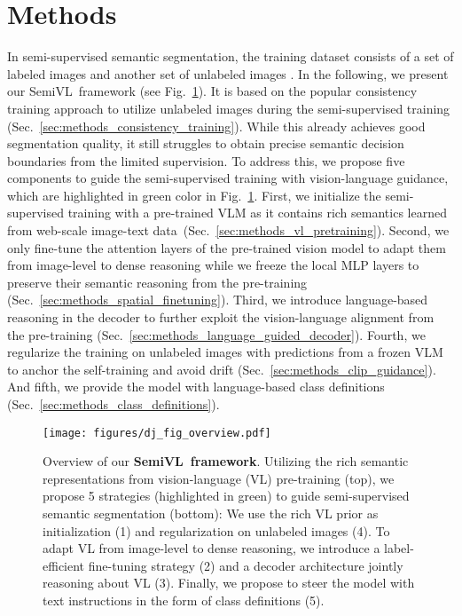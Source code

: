 \documentclass[10pt,twocolumn,letterpaper]{article}
\newcommand{\ours}{SemiVL}
\begin{document}
 \section{Methods}

In semi-supervised semantic segmentation, the training dataset consists of a set of labeled images  and another set of unlabeled images .
In the following, we present our \ours\ framework (see Fig.~\ref{fig:overview}). It is based on the popular consistency training approach to utilize unlabeled images during the semi-supervised training (Sec.~\ref{sec:methods_consistency_training}). While this already achieves good segmentation quality, it still struggles to obtain precise semantic decision boundaries from the limited supervision. To address this, we propose five components to guide the semi-supervised training with vision-language guidance, which are highlighted in green color in Fig.~\ref{fig:overview}. First, we initialize the semi-supervised training with 
a pre-trained VLM as it contains rich semantics learned from web-scale image-text data~(Sec.~\ref{sec:methods_vl_pretraining}).
Second, we only fine-tune the attention layers of the pre-trained vision model to adapt them from image-level to dense reasoning while we freeze the local MLP layers to preserve their semantic reasoning from the pre-training (Sec.~\ref{sec:methods_spatial_finetuning}).
Third, we introduce language-based reasoning in the decoder to further exploit the vision-language alignment from the pre-training (Sec.~\ref{sec:methods_language_guided_decoder}). Fourth, we regularize the training on unlabeled images with predictions from a frozen VLM to anchor the self-training and avoid drift (Sec.~\ref{sec:methods_clip_guidance}). And fifth, we provide the model with language-based class definitions (Sec.~\ref{sec:methods_class_definitions}).

\begin{figure}
    \centering
    \texttt{[image: figures/dj\_fig\_overview.pdf]}
    \caption{Overview of our \textbf{\ours\ framework}. Utilizing the rich semantic representations from vision-language (VL) pre-training (top), we propose 5 strategies (highlighted in green) to guide semi-supervised semantic segmentation (bottom): We use the rich VL prior as initialization (1) and regularization on unlabeled images (4). To adapt VL from image-level to dense reasoning, we introduce a label-efficient fine-tuning strategy (2) and a decoder architecture jointly reasoning about VL (3). Finally, we propose to steer the model with text instructions in the form of class definitions (5).}
    \label{fig:overview}
\end{figure}
\end{document}
